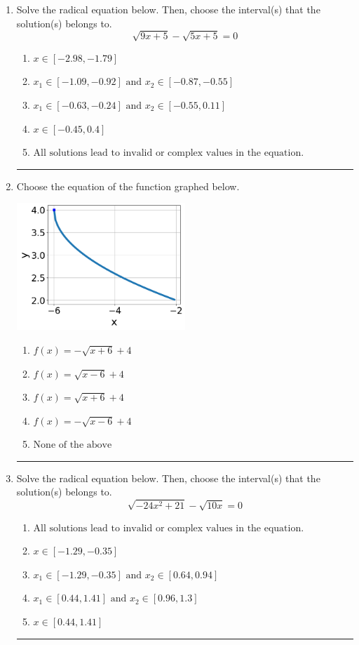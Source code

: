 \documentclass[14pt]{extbook}
\newcommand{\litem}[1]{\item#1\hspace*{-1cm}\rule{\textwidth}{0.4pt}}
\begin{document}
\begin{enumerate}
{\begin{enumerate}[label=\Alph*.]
\end{enumerate} }
\litem{
Solve the radical equation below. Then, choose the interval(s) that the solution(s) belongs to.\[ \sqrt{9 x + 5} - \sqrt{5 x + 5} = 0 \]\begin{enumerate}[label=\Alph*.]
\item \( x \in [-2.98,-1.79] \)
\item \( x_1 \in [-1.09, -0.92] \text{ and } x_2 \in [-0.87,-0.55] \)
\item \( x_1 \in [-0.63, -0.24] \text{ and } x_2 \in [-0.55,0.11] \)
\item \( x \in [-0.45,0.4] \)
\item \( \text{All solutions lead to invalid or complex values in the equation.} \)

\end{enumerate} }
\litem{
Choose the equation of the function graphed below.
\begin{center}
    \includegraphics[width=0.5\textwidth]{../Figures/radicalGraphToEquationCopyA.png}
\end{center}
\begin{enumerate}[label=\Alph*.]
\item \( f(x) = - \sqrt{x + 6} + 4 \)
\item \( f(x) = \sqrt{x - 6} + 4 \)
\item \( f(x) = \sqrt{x + 6} + 4 \)
\item \( f(x) = - \sqrt{x - 6} + 4 \)
\item \( \text{None of the above} \)

\end{enumerate} }
\litem{
Solve the radical equation below. Then, choose the interval(s) that the solution(s) belongs to.\[ \sqrt{-24 x^2 + 21} - \sqrt{10 x} = 0 \]\begin{enumerate}[label=\Alph*.]
\item \( \text{All solutions lead to invalid or complex values in the equation.} \)
\item \( x \in [-1.29,-0.35] \)
\item \( x_1 \in [-1.29, -0.35] \text{ and } x_2 \in [0.64,0.94] \)
\item \( x_1 \in [0.44, 1.41] \text{ and } x_2 \in [0.96,1.3] \)
\item \( x \in [0.44,1.41] \)


\end{enumerate}}
\end{enumerate}
\end{document}
